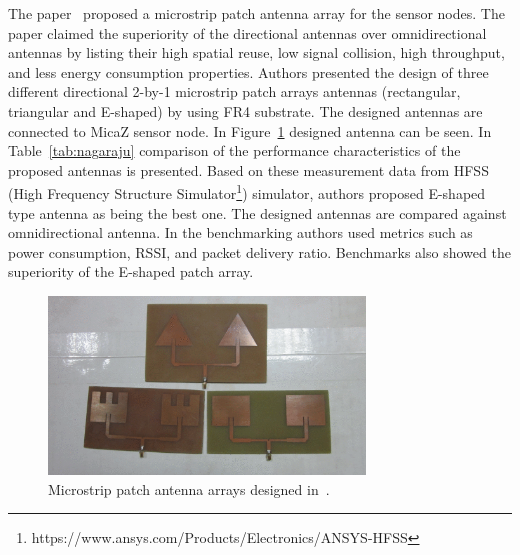 \documentclass[12pt, oneandhalf, chaparabic, sees, ms]{metu}
\begin{document}
The paper~\cite{nagaraju2014} proposed a microstrip patch antenna array for the sensor nodes. The paper claimed the superiority of the directional
antennas over omnidirectional antennas by listing their high spatial reuse, low signal collision, high throughput, and less energy consumption properties.
Authors presented the design of three different directional 2-by-1 microstrip patch arrays antennas (rectangular, triangular and E-shaped) by using FR4 substrate. 
The designed antennas are connected to MicaZ sensor node. 
In Figure~\ref{fig:nagaraju} designed antenna can be seen. In Table~\ref{tab:nagaraju} comparison of the performance characteristics of the proposed antennas is presented.
Based on these measurement data from HFSS (High Frequency Structure Simulator\footnote{https://www.ansys.com/Products/Electronics/ANSYS-HFSS}) simulator, authors proposed E-shaped 
type antenna as being the best one. The designed antennas are compared against omnidirectional antenna. In the benchmarking authors used metrics such as power consumption, RSSI,
and packet delivery ratio. Benchmarks also showed the superiority of the E-shaped patch array.
%
%
%
\begin{figure}[!htbp]
 \begin{center}
  \includegraphics[width=0.75\textwidth]{nagaraju-antenna.png}
 \end{center}
 \caption{Microstrip patch antenna arrays designed in~\cite{nagaraju2014}.}
  \label{fig:nagaraju}
\end{figure}
% 
%
%
\end{document}
